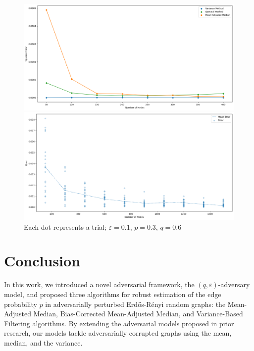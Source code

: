 \documentclass[10pt,onecolumn,letterpaper]{article}
\newcommand{\eps}{\varepsilon}
\begin{document}
\begin{figure}[ht]
    \begin{minipage}{0.45\textwidth}
        \centering
        \includegraphics[width=\linewidth]{img/emperic3.png}
        \caption{$\eps = 0.01$, $p = 0.3$, $q = 0.6$}
        \label{fig:result3}
    \end{minipage} \hfill
    \begin{minipage}{0.45\textwidth}
        \centering
        \includegraphics[width=\linewidth]{img/emperic4.png}
        \caption{Each dot represents a trial; $\eps = 0.1$, $p = 0.3$, $q = 0.6$}
        \label{fig:result4}
    \end{minipage}
\end{figure}


\section{Conclusion}
In this work, we introduced a novel adversarial framework, the \((q, \eps)\)-adversary model, and proposed three algorithms for robust estimation of the edge probability \(p\) in adversarially perturbed Erdős-Rényi random graphs: the Mean-Adjusted Median, Bias-Corrected Mean-Adjusted Median, and Variance-Based Filtering algorithms. By extending the adversarial models proposed in prior research, our models tackle adversarially corrupted graphs using the mean, median, and the variance.
\end{document}
